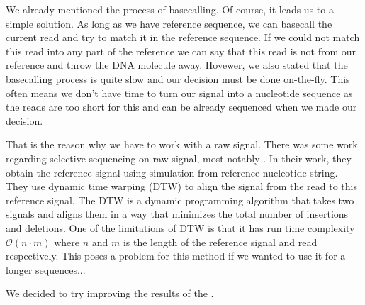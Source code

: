 
We already mentioned the process of basecalling. Of course, it leads us to a simple
solution. As long as we have reference sequence, we can basecall the current read
and try to match it in the reference sequence. If we could not match this read
into any part of the reference we can say that this read is not from our reference
and throw the DNA molecule away. Hovewer, we also stated that the basecalling process
is quite slow and our decision must be done on-the-fly. This often means we don't
have time to turn our signal into a nucleotide sequence as the reads are too short for this
and can be already sequenced when we made our decision.

That is the reason why we have to work with a raw signal. There was some work
regarding selective sequencing on raw signal, most notably \cite{loose2016real}. In their
work, they obtain the reference signal using simulation from reference nucleotide
string. They use dynamic time warping (DTW) to align the signal from the read to
this reference signal. The DTW is a dynamic programming algorithm that takes two signals and aligns them in a
way that minimizes the total number of insertions and deletions. One of the limitations
of DTW is that it has run time complexity $\mathcal{O}(n\cdot m)$ where $n$ and $m$
is the length of the reference signal and read respectively. This poses a problem
for this method if we wanted to use it for a longer sequences...

We decided to try improving the results of the \cite{loose2016real}.

